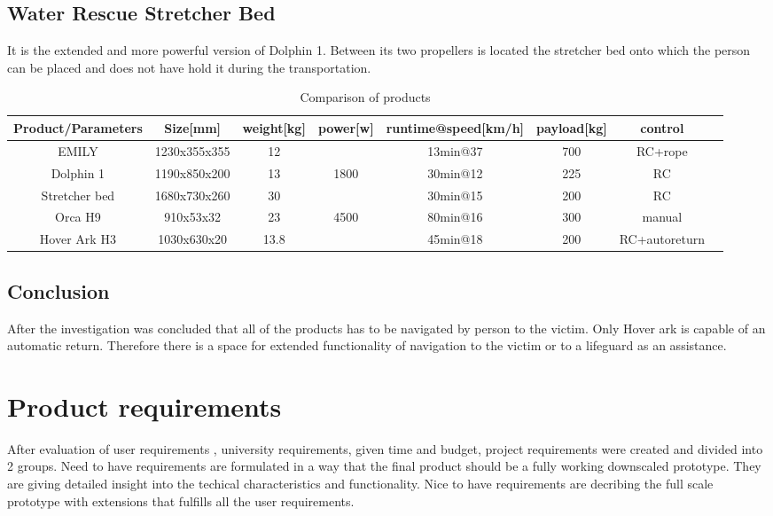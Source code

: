\subsection {Water Rescue Stretcher Bed}
It is the extended and more powerful version of Dolphin 1. Between its two propellers is located the stretcher bed onto which the person can be placed and does not have hold it during the transportation.


\begin{table}[h!]
    \centering
\begin{tabular}{|c|c|c|c|c|c|c|c| }
    
\hline
Product/Parameters & Size[mm] & weight[kg] & power[w] & runtime@speed[km/h] & payload[kg] & control  \\
\hline
EMILY & 1230x355x355 & 12 &  & 13min@37 & 700 & RC+rope \\
Dolphin 1 & 1190x850x200 & 13 & 1800 & 30min@12 & 225 & RC  \\
Stretcher bed &1680x730x260  & 30  &  & 30min@15 & 200  & RC  \\
Orca H9 & 910x53x32 & 23 & 4500& 80min@16  & 300 & manual \\
Hover Ark H3 & 1030x630x20 & 13.8 &  & 45min@18 & 200 & RC+autoreturn  \\
\hline



\hline
\end{tabular}
 \caption{Comparison of products }
    \label{tab:Comparison of products}

\end{table}
\subsection{Conclusion}
After the investigation was concluded that all of the products has to be navigated by person to the victim. 
Only Hover ark is capable of an automatic return. Therefore there is a space for extended functionality of navigation to the victim or to a lifeguard as an assistance. 

\section{Product requirements}
After evaluation of user requirements , university requirements, given time and budget, project requirements were created and divided 
into 2 groups. Need to have requirements are formulated in a way that the final product should be a fully working downscaled prototype. 
They are giving detailed insight into the techical characteristics and functionality. Nice to 
have requirements are decribing the full scale prototype with extensions that fulfills all the user requirements.
